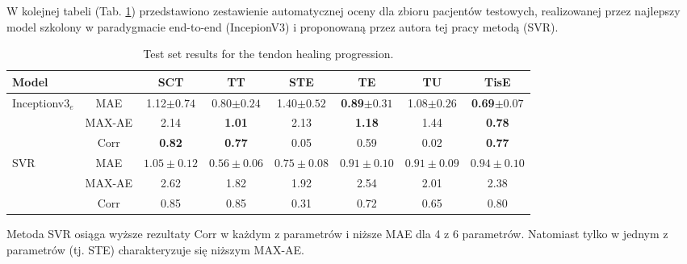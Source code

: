 W kolejnej tabeli (Tab. \ref{tab:end-to-end_testset}) przedstawiono zestawienie automatycznej oceny dla zbioru pacjentów testowych, realizowanej przez najlepszy model szkolony w paradygmacie end-to-end (IncepionV3) i proponowaną przez autora tej pracy metodą (SVR).  

\begin{table}[t]
	\caption{Test set results for the tendon healing progression.}
	\scriptsize
	\begin{center}
		\begin{tabular}{lc||c|c|c|c|c|c}
			\textbf{Model} & & \textbf{SCT} & \textbf{TT} & \textbf{STE} & \textbf{TE} & \textbf{TU} & \textbf{TisE}\\ 
			
\hline
			Inceptionv3$_{e}$ & MAE & 1.12$\pm{0.74}$ & 0.80$\pm{0.24}$ & 1.40$\pm{0.52}$ & \textbf{0.89}$\pm{0.31}$ & 1.08$\pm{0.26}$ & \textbf{0.69}$\pm{0.07}$ \\
			& MAX-AE & 2.14 & \textbf{1.01} & 2.13 & \textbf{1.18} & 1.44 & \textbf{0.78} \\
			& Corr & \textbf{0.82} & \textbf{0.77} & 0.05 & 0.59 & 0.02 & \textbf{0.77} \\ \hline
			SVR & MAE & $1.05\pm0.12$ & $0.56\pm0.06$ & $0.75\pm0.08$ & $0.91\pm0.10$ & $0.91\pm0.09$ & $0.94\pm0.10$\\
			& MAX-AE & 2.62 & 1.82 & 1.92 & 2.54 & 2.01 & 2.38 \\
			& Corr   & 0.85 & 0.85 & 0.31 & 0.72 & 0.65 & 0.80 
		\end{tabular}
	\end{center}
	\label{tab:end-to-end_testset}
\end{table}

Metoda SVR osiąga wyższe rezultaty Corr w każdym z parametrów i niższe MAE dla 4 z 6 parametrów. Natomiast tylko w jednym z parametrów (tj. STE) charakteryzuje się niższym MAX-AE. 

